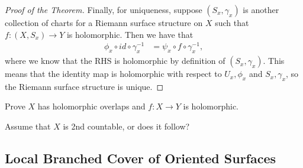 \documentclass{article}
\begin{document}
\begin{proof}[Proof of the Theorem]
    Finally, for uniqueness, suppose $(S_x, \gamma_x)$ is another collection of charts for a Riemann surface structure on $X$ such that $f: (X, S_x) \to Y$ is holomorphic. Then we have that
    \begin{align*}
        \phi_x \circ id \circ \gamma_x^{-1} &= \psi_x \circ f \circ \gamma_x^{-1},
    \end{align*}
    where we know that the RHS is holomorphic by definition of $(S_x, \gamma_x)$. This means that the identity map is holomorphic with respect to $U_x, \phi_x$ and $S_x, \gamma_x$, so the Riemann surface structure is unique.
\end{proof}

    


\begin{exercise}
    Prove $X$ has holomorphic overlaps and $f: X \to Y$ is holomorphic.
\end{exercise}

\begin{exercise}
    Assume that $X$ is 2nd countable, or does it follow?
\end{exercise}

\subsection{Local Branched Cover of Oriented Surfaces}
\end{document}
